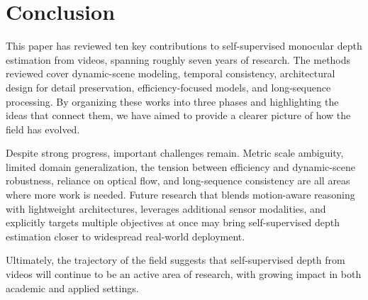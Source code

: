 \documentclass[10pt,twocolumn,letterpaper]{article}
\begin{document}
\section{Conclusion}
\label{sec:conclusion}

This paper has reviewed ten key contributions to self-supervised monocular depth estimation from videos, spanning roughly seven years of research. The methods reviewed cover dynamic-scene modeling, temporal consistency, architectural design for detail preservation, efficiency-focused models, and long-sequence processing. By organizing these works into three phases and highlighting the ideas that connect them, we have aimed to provide a clearer picture of how the field has evolved.

Despite strong progress, important challenges remain. Metric scale ambiguity, limited domain generalization, the tension between efficiency and dynamic-scene robustness, reliance on optical flow, and long-sequence consistency are all areas where more work is needed. Future research that blends motion-aware reasoning with lightweight architectures, leverages additional sensor modalities, and explicitly targets multiple objectives at once may bring self-supervised depth estimation closer to widespread real-world deployment.

Ultimately, the trajectory of the field suggests that self-supervised depth from videos will continue to be an active area of research, with growing impact in both academic and applied settings.
\end{document}
